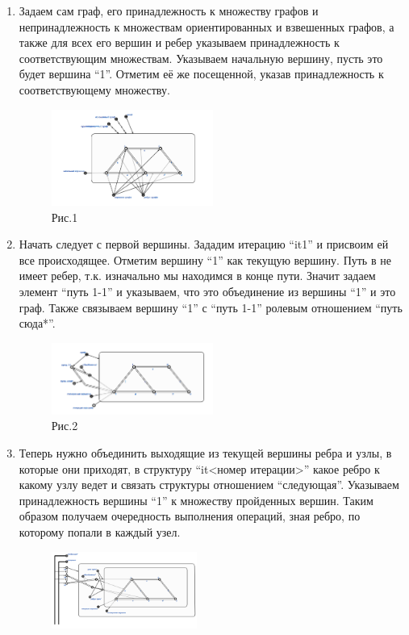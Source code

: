 \documentclass[10pt,a4paper,twocolumn]{article}
\begin{document}
\begin{enumerate}
	\item Задаем сам граф, его принадлежность к множеству графов и непринадлежность к множествам ориентированных и взвешенных графов, а также для всех его вершин и ребер указываем принадлежность к соответствующим множествам. Указываем начальную вершину, пусть это будет вершина ``1''. Отметим её же посещенной, указав принадлежность к соответствующему множеству.
	\begin{figure}[h!]
		\includegraphics[width=0.5\textwidth]{img/img1.png}
		\caption{Рис.1}
	\end{figure}
	\item Начать следует с первой вершины. Зададим итерацию ``it1'' и присвоим ей все происходящее. Отметим вершину ``1'' как текущую вершину. Путь в не имеет ребер, т.к. изначально мы находимся в конце пути. Значит задаем элемент ``путь 1-1'' и указываем, что это объединение из вершины ``1'' и это граф. Также связываем вершину ``1'' с ``путь 1-1'' ролевым отношением ``путь сюда*''.
	\begin{figure}[h!]
		\includegraphics[width=0.5\textwidth]{img/img2.png}
		\caption{Рис.2}
	\end{figure}
	\item Теперь нужно объединить выходящие из текущей вершины ребра и узлы, в которые они приходят, в структуру ``it<номер итерации>'' какое ребро к какому узлу ведет и связать структуры отношением ``следующая''. Указываем принадлежность вершины ``1'' к множеству пройденных вершин. Таким образом получаем очередность выполнения операций, зная ребро, по которому попали в каждый узел.  
	\begin{figure}[h]
		\includegraphics[width=0.45\textwidth]{img/img3.png}

\end{figure}
\end{enumerate}
\end{document}
